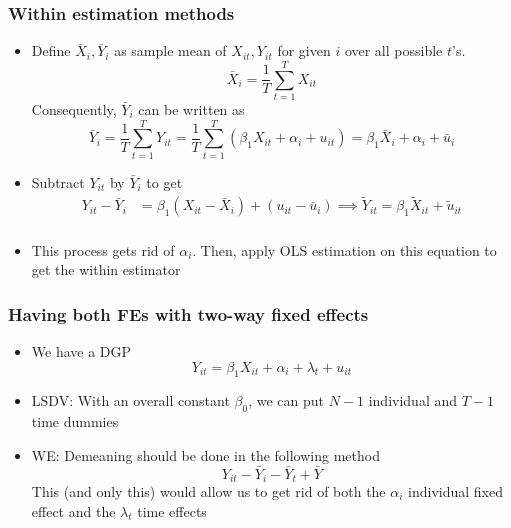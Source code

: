 \documentclass[aspectratio=169]{beamer}
\begin{document}
\begin{frame}
\frametitle{Within estimation methods}
\begin{itemize}
\item Define $\bar{X}_i, \bar{Y}_i$ as sample mean of $X_{it}, Y_{it}$ for given $i$ over all possible $t$'s. 
\[
\bar{X}_i = \frac{1}{T}\sum_{t=1}^TX_{it}
\]
Consequently, $\bar{Y}_i$ can be written as
\[
\bar{Y}_i = \frac{1}{T}\sum_{t=1}^TY_{it}=\frac{1}{T}\sum_{t=1}^T\left(\beta_1 X_{it} +\alpha_i +u_{it}\right)=\beta_1 \bar{X}_i +\alpha_i + \bar{u}_{i}
\]
\item Subtract $Y_{it}$ by $\bar{Y}_i$ to get
\[
\begin{aligned}
Y_{it}-\bar{Y}_i &= \beta_1(X_{it}-\bar{X}_i) + (u_{it}-\bar{u}_i) \implies \tilde{Y}_{it}= \beta_1 \tilde{X}_{it}+\tilde{u}_{it}\\
\end{aligned}
\]
\item This process gets rid of $\alpha_i$. Then, apply OLS estimation on this equation to get the within estimator
\end{itemize}
\end{frame}


\begin{frame}
\frametitle{Having both FEs with two-way fixed effects}
\begin{itemize}
\item We have a DGP
\[
Y_{it}=\beta_1 X_{it} + \alpha_i +\lambda_t + u_{it}
\]
\item LSDV: With an overall constant $\beta_0$, we can put $N-1$ individual and $T-1$ time dummies
\item WE: Demeaning should be done in the following method
\[
Y_{it}-\bar{Y}_i -\bar{Y}_t +\bar{Y}
\]
This (and only this) would allow us to get rid of both the $\alpha_i$ individual fixed effect and the $\lambda_t$ time effects
\end{itemize}
\end{frame}
\end{document}
